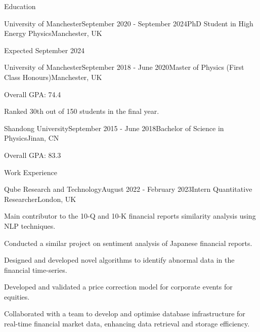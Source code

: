 \documentclass{resume} %
\begin{document}
    \begin{rSection}{Education}
        \begin{rSubsection}{University of Manchester}{September 2020 - September 2024}{PhD Student in High Energy Physics}{Manchester, UK}
            \item Expected September 2024 
        \end{rSubsection}
        \begin{rSubsection}{University of Manchester}{September 2018 - June 2020}{Master of Physics (First Class Honours)}{Manchester, UK}
            \item Overall GPA: 74.4
            \item Ranked 30th out of 150 students in the final year.
        \end{rSubsection}
        \begin{rSubsection}{Shandong University}{September 2015 - June 2018}{Bachelor of Science in Physics}{Jinan, CN}
            \item Overall GPA: 83.3
        \end{rSubsection}
    \end{rSection}

    \begin{rSection}{Work Experience}
        \begin{rSubsection}{Qube Research and Technology}{August 2022 - February 2023}{Intern Quantitative Researcher}{London, UK}
            \item Main contributor to the 10-Q and 10-K financial reports similarity analysis using NLP techniques.
            \item Conducted a similar project on sentiment analysis of Japanese financial reports.
            \item Designed and developed novel algorithms to identify abnormal data in the financial time-series.
            \item Developed and validated a price correction model for corporate events for equities.
            \item Collaborated with a team to develop and optimise database infrastructure for real-time financial market data, enhancing data retrieval and storage efficiency.
        \end{rSubsection}
    \end{rSection}
\end{document}
